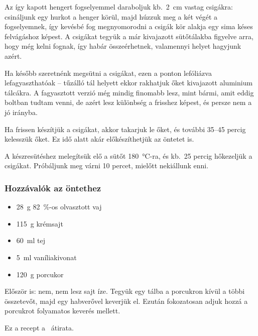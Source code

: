 Az így kapott hengert fogselyemmel daraboljuk kb.~\qty{2}{\cm} vastag csigákra: csináljunk egy hurkot a henger körül, majd húzzuk meg a két végét a fogselyemnek, így kevésbé fog megnyomorodni a csigák kör alakja egy sima késes felvágáshoz képest. A csigákat tegyük a már kivajazott sütőtálakba figyelve arra, hogy még kelni fognak, így habár összeérhetnek, valamennyi helyet hagyjunk azért.

Ha később szeretnénk megsütni a csigákat, ezen a ponton lefóliázva lefagyaszthatóak -- tűzálló tál helyett ekkor rakhatjuk őket kivajazott aluminium tálcákra. A fagyasztott verzió még mindig finomabb lesz, mint bármi, amit eddig boltban tudtam venni, de azért lesz különbség a frisshez képest, és persze nem a jó irányba.

Ha frissen készítjük a csigákat, akkor takarjuk le őket, és további \numrange{35}{45} percig kelesszük őket. Ez idő alatt akár előkészíthetjük az öntetet is.

A készresütéshez melegítsük elő a sütőt \qty{180}{\celsius}-ra, és kb.~\num{25} percig hőkezeljük a csigákat. Próbáljunk meg várni \num{10} percet, mielőtt nekiállunk enni.

\subsubsection*{Hozzávalók az öntethez}
\begin{itemize}
    \item \qty{28}{\g} \qty{82}{\percent}-os olvasztott vaj
    \item \qty{115}{\g} krémsajt
    \item \qty{60}{\ml} tej
    \item \qty{5}{\ml} vaníliakivonat
    \item \qty{120}{\g} porcukor
\end{itemize}

Először is: nem, nem lesz sajt íze. Tegyük egy tálba a porcukron kívül a többi összetevőt, majd egy habverővel keverjük el. Ezután fokozatosan adjuk hozzá a porcukrot folyamatos keverés mellett.

Ez a recept a~\cite{tasty_fahejas_csiga} átirata.
